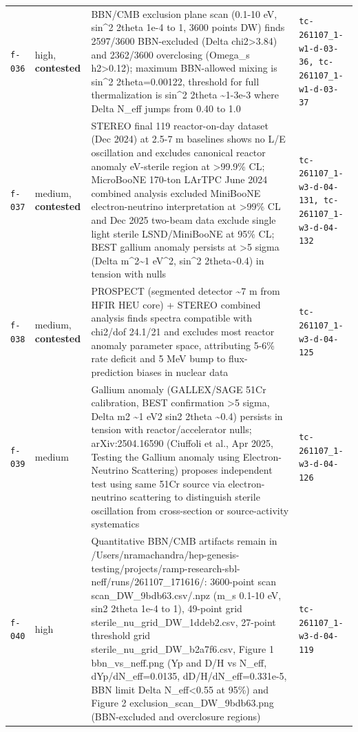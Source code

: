 \documentclass[11pt,a4paper]{article}
\begin{document}
\begin{longtable}{@{}p{}p{}p{}p{}@{}}
\texttt{f-036} & high, \textbf{contested} & BBN/CMB exclusion plane scan (0.1-10 eV, sin\textasciicircum{}2 2theta 1e-4 to 1, 3600 points DW) finds 2597/3600 BBN-excluded (Delta chi2\textgreater{}3.84) and 2362/3600 overclosing (Omega\_s h2\textgreater{}0.12); maximum BBN-allowed mixing is sin\textasciicircum{}2 2theta=0.00122, threshold for full thermalization is sin\textasciicircum{}2 2theta \textasciitilde{}1-3e-3 where Delta N\_eff jumps from 0.40 to 1.0 & \texttt{tc-261107\_\allowbreak{}1-w1-d-03-36,\allowbreak{} tc-261107\_\allowbreak{}1-w1-d-03-37} \\
\texttt{f-037} & medium, \textbf{contested} & STEREO final 119 reactor-on-day dataset (Dec 2024) at 2.5-7 m baselines shows no L/E oscillation and excludes canonical reactor anomaly eV-sterile region at \textgreater{}99.9\% CL; MicroBooNE 170-ton LArTPC June 2024 combined analysis excluded MiniBooNE electron-neutrino interpretation at \textgreater{}99\% CL and Dec 2025 two-beam data exclude single light sterile LSND/MiniBooNE at 95\% CL; BEST gallium anomaly persists at \textgreater{}5 sigma (Delta m\textasciicircum{}2\textasciitilde{}1 eV\textasciicircum{}2, sin\textasciicircum{}2 2theta\textasciitilde{}0.4) in tension with nulls & \texttt{tc-261107\_\allowbreak{}1-w3-d-04-131,\allowbreak{} tc-261107\_\allowbreak{}1-w3-d-04-132} \\
\texttt{f-038} & medium, \textbf{contested} & PROSPECT (segmented detector \textasciitilde{}7 m from HFIR HEU core) + STEREO combined analysis finds spectra compatible with chi2/dof 24.1/21 and excludes most reactor anomaly parameter space, attributing 5-6\% rate deficit and 5 MeV bump to flux-prediction biases in nuclear data & \texttt{tc-261107\_\allowbreak{}1-w3-d-04-125} \\
\texttt{f-039} & medium & Gallium anomaly (GALLEX/SAGE 51Cr calibration, BEST confirmation \textgreater{}5 sigma, Delta m2 \textasciitilde{}1 eV2 sin2 2theta \textasciitilde{}0.4) persists in tension with reactor/accelerator nulls; arXiv:2504.16590 (Ciuffoli et al., Apr 2025, Testing the Gallium anomaly using Electron-Neutrino Scattering) proposes independent test using same 51Cr source via electron-neutrino scattering to distinguish sterile oscillation from cross-section or source-activity systematics & \texttt{tc-261107\_\allowbreak{}1-w3-d-04-126} \\
\texttt{f-040} & high & Quantitative BBN/CMB artifacts remain in /Users/nramachandra/hep-genesis-testing/projects/ramp-research-sbl-neff/runs/261107\_171616/: 3600-point scan scan\_DW\_9bdb63.csv/.npz (m\_s 0.1-10 eV, sin2 2theta 1e-4 to 1), 49-point grid sterile\_nu\_grid\_DW\_1ddeb2.csv, 27-point threshold grid sterile\_nu\_grid\_DW\_b2a7f6.csv, Figure 1 bbn\_vs\_neff.png (Yp and D/H vs N\_eff, dYp/dN\_eff=0.0135, dD/H/dN\_eff=0.331e-5, BBN limit Delta N\_eff\textless{}0.55 at 95\%) and Figure 2 exclusion\_scan\_DW\_9bdb63.png (BBN-excluded and overclosure regions) & \texttt{tc-261107\_\allowbreak{}1-w3-d-04-119} \\

\end{longtable}
\end{document}
